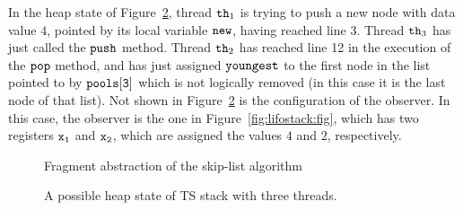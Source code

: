 In the heap state of Figure~\ref{fig:tsshape},
thread ${\tt th}_1$ is trying to push a new node with data value $4$, pointed by its local variable $\tt new$, having reached line 3.
Thread ${\tt th}_3$ has just called the ${\tt push}$ method.
Thread ${\tt th}_2$ has reached line 12 in the execution of the ${\tt pop}$ method,  and has just assigned ${\tt youngest}$ to the first node in the list
pointed to by $\tt pools[3]$ which is not logically removed (in this case it is the last node of that list).
Not shown in Figure~\ref{fig:tsshape} is the configuration of the
observer.
In this case, the
observer is the one in Figure~\ref{fig:lifostack:fig}, which has two registers
$\tt x_1$ and $\tt x_2$, which are assigned the values $4$ and $2$,
respectively.

\begin{figure}
\center  
   
 \caption{Fragment abstraction of the skip-list algorithm}
\label{sl-abs}
\end{figure}

\begin{figure}
	
\caption{A possible heap state of TS stack with three threads.}
\label{fig:tsshape}
\end{figure} 

